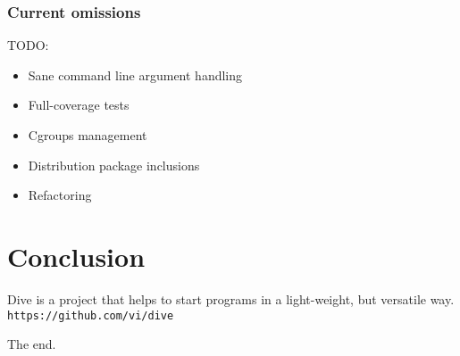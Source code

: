 \documentclass[aspectratio=43]{beamer}
\newcommand{\C}{\lstinline}
\begin{document}
\begin{frame}
    \frametitle{Current omissions}
    TODO:
    \vfill
    \begin{itemize}
        \item Sane command line argument handling
        \item Full-coverage tests
        \item Cgroups management
        \item Distribution package inclusions
        \item Refactoring
    \end{itemize}
\end{frame}

\section{Conclusion}

\begin{frame}
    Dive is a project that helps to start programs in a light-weight, but versatile way.\\
    \vfill
    \C!https://github.com/vi/dive!\\
    \vfill
    \centerline{\LARGE{The end.}}
\end{frame}
\end{document}

